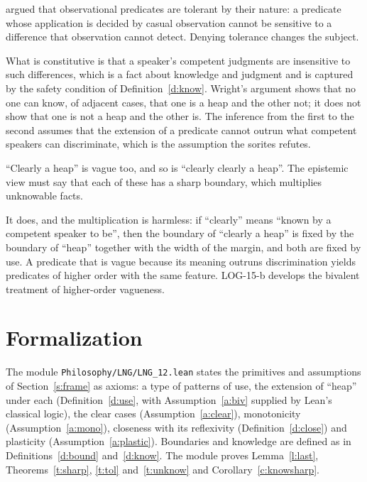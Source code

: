 \documentclass{situationist-preprint}
\begin{document}
\begin{objection}
\citet{Wright1975} argued that observational predicates are tolerant by their nature: a predicate whose application is decided by casual observation cannot be sensitive to a difference that observation cannot detect. Denying tolerance changes the subject.
\end{objection}

\begin{reply}
What is constitutive is that a speaker's competent judgments are insensitive to such differences, which is a fact about knowledge and judgment and is captured by the safety condition of Definition~\ref{d:know}. Wright's argument shows that no one can know, of adjacent cases, that one is a heap and the other not; it does not show that one is not a heap and the other is. The inference from the first to the second assumes that the extension of a predicate cannot outrun what competent speakers can discriminate, which is the assumption the sorites refutes.
\end{reply}

\begin{objection}
\enquote{Clearly a heap} is vague too, and so is \enquote{clearly clearly a heap}. The epistemic view must say that each of these has a sharp boundary, which multiplies unknowable facts.
\end{objection}

\begin{reply}
It does, and the multiplication is harmless: if \enquote{clearly} means \enquote{known by a competent speaker to be}, then the boundary of \enquote{clearly a heap} is fixed by the boundary of \enquote{heap} together with the width of the margin, and both are fixed by use. A predicate that is vague because its meaning outruns discrimination yields predicates of higher order with the same feature. LOG-15-b develops the bivalent treatment of higher-order vagueness.
\end{reply}

\section{Formalization}

The module \nolinkurl{Philosophy/LNG/LNG_12.lean} states the primitives and assumptions of Section~\ref{s:frame} as axioms: a type of patterns of use, the extension of \enquote{heap} under each (Definition~\ref{d:use}, with Assumption~\ref{a:biv} supplied by Lean's classical logic), the clear cases (Assumption~\ref{a:clear}), monotonicity (Assumption~\ref{a:mono}), closeness with its reflexivity (Definition~\ref{d:close}) and plasticity (Assumption~\ref{a:plastic}). Boundaries and knowledge are defined as in Definitions~\ref{d:bound} and~\ref{d:know}. The module proves Lemma~\ref{l:last}, Theorems~\ref{t:sharp}, \ref{t:tol} and~\ref{t:unknow} and Corollary~\ref{c:knowsharp}.
\end{document}
